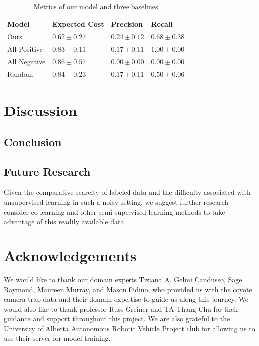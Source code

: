 \documentclass{article}
\begin{document}
\begin{table}
  \caption{Metrics of our model and three baselines}
  \label{results}
  \centering
  \begin{tabular}{llll}
    \topfigrule
    Model     & Expected Cost     & Precision & Recall \\
    \midrule
    Ours & $\mathbf{0.62} \pm 0.27$ & $\mathbf{0.24} \pm 0.12$ & $0.68 \pm 0.38$     \\
    All Positive & $0.83 \pm 0.11$    & $0.17 \pm 0.11$ & $\mathbf{1.00} \pm 0.00$     \\
    All Negative & $0.86 \pm 0.57$    & $0.00 \pm 0.00$ & $0.00 \pm 0.00$     \\
    Random & $0.84 \pm 0.23$    & $0.17 \pm 0.11$ & $0.50 \pm 0.06$     \\
    \bottomrule
  \end{tabular}
\end{table}

\section{Discussion}

\subsection{Conclusion}

\subsection{Future Research}
Given the comparative scarcity of labeled data and the difficulty associated
with unsupervised learning in such a noisy setting, we suggest further research
consider co-learning and other semi-supervised learning methods to take
advantage of this readily available data.

\section{Acknowledgements}
We would like to thank our domain experts Tiziana A. Gelmi Candusso, Sage
Raymond, Maureen Murray, and Mason Fidino, who provided us with the coyote
camera trap data and their domain expertise to guide us along this journey. We
would also like to thank professor Russ Greiner and TA Thang Chu for their
guidance and support throughout this project. We are also grateful to the
University of Alberta Autonomous Robotic Vehicle Project club for allowing us
to use their server for model training.

\clearpage


\end{document}
